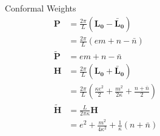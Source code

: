 \newcommand{\uL}{\mathbf{L_0}}
\newcommand{\bL}{\mathbf{\bar{L}_0}}
\begin{columns}[T]
\begin{column}{.4\textwidth}
\begin{block}{Conformal Weights}
\vskip0.5cm
\begin{align*}
	\mathbf{P} &=\frac{2\pi}{L}(\uL-\bL)  \\
	& = \frac{2\pi}{L}(em + n - \bar{n}) \\
	\widetilde{\mathbf{P}}&= em + n - \bar{n}\\ 
	\mathbf{H} &= \frac{2\pi}{L}(\uL+\bL)  \\
	&= \frac{2\pi}{L}(\frac{\kappa e^2}{2} + \frac{m^2}{2 \kappa} + \frac{n + \bar{n}}{2}) \\
	\widetilde{\mathbf{H}} &= \frac{L}{2 \pi \kappa}\mathbf{H} \\
&	= e^2 + \frac{m^2}{4 \kappa^2} + \frac{1}{\kappa}(n + \bar{n})
\end{align*}
\end{block}

%

\end{column}
\begin{column}{.6\textwidth}


\end{column}
\end{columns}
